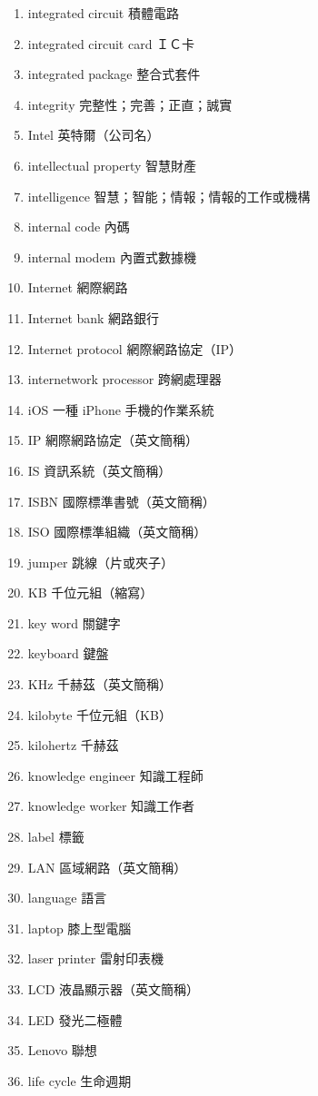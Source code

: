 \begin{enumerate}
  \item integrated circuit 積體電路
  \item integrated circuit card ＩＣ卡
  \item integrated package 整合式套件
  \item integrity 完整性；完善；正直；誠實
  \item Intel 英特爾（公司名）
  \item intellectual property 智慧財產
  \item intelligence 智慧；智能；情報；情報的工作或機構
  \item internal code 內碼
  \item internal modem 內置式數據機
  \item Internet 網際網路
  \item Internet bank 網路銀行
  \item Internet protocol 網際網路協定（IP）
  \item internetwork processor 跨網處理器
  \item iOS 一種 iPhone 手機的作業系統
  \item IP 網際網路協定（英文簡稱）
  \item IS 資訊系統（英文簡稱）
  \item ISBN 國際標準書號（英文簡稱）
  \item ISO 國際標準組織（英文簡稱）
  \item jumper 跳線（片或夾子）
  \item KB 千位元組（縮寫）
  \item key word 關鍵字
  \item keyboard 鍵盤
  \item KHz 千赫茲（英文簡稱）
  \item kilobyte 千位元組（KB）
  \item kilohertz 千赫茲
  \item knowledge engineer 知識工程師
  \item knowledge worker 知識工作者
  \item label 標籤
  \item LAN 區域網路（英文簡稱）
  \item language 語言
  \item laptop 膝上型電腦
  \item laser printer 雷射印表機
  \item LCD 液晶顯示器（英文簡稱）
  \item LED 發光二極體
  \item Lenovo 聯想
  \item life cycle 生命週期

\end{enumerate}
